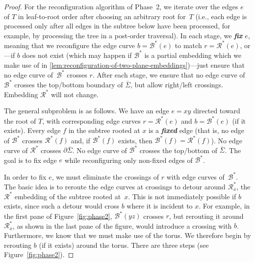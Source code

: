 \documentclass[a4paper,USenglish,cleveref,colorlinks=true,urlcolor=black,linkcolor=black,citecolor=black,thm-restate,authorcolumns]{lipics-v2021}
\theoremstyle{claimstyle}
\def\defn#1{\textit{\textbf{\boldmath #1}}}
\begin{document}
\begin{proof}
    For the reconfiguration algorithm of Phase~2,
    we iterate over the edges $e$ of $T$ in leaf-to-root order after choosing an arbitrary root for~$T$
    (i.e., each edge is processed only after all edges in the subtree below have been processed, for example, by processing the tree in a post-order traversal).
    In each stage, we \defn{fix} $e$, meaning that we reconfigure the edge curve $b = \mathcal B^* (e)$ to match $r = {\mathcal R}^*(e)$,
    or---if $b$ does not exist (which may happen if $\mathcal{B}^*$ is a partial embedding which we make use of in \cref{lem:reconfiguration-of-two-plane-embeddings})---just ensure that no edge curve of~$\mathcal B^*$ crosses $r$.
    After each stage, we ensure that no edge curve of $\mathcal B^*$ crosses the top/bottom boundary of $\bar\Sigma$, but allow right/left crossings.
    Embedding ${\mathcal R}^*$ will not change.


    The general subproblem is as follows.
    We have an edge $e = xy$ directed toward the root of $T$, with corresponding edge curves $r= \mathcal{R}^*(e)$ and $b= \mathcal{B}^*(e)$ (if it exists).
    Every edge $f$ in the subtree rooted at $x$ is a \defn{fixed} edge (that is,
    no edge of $\mathcal B^*$ crosses ${\mathcal R}^*(f)$ and, if $\mathcal B^* (f)$ exists, then
    $\mathcal B^* (f)= {\mathcal R}^*(f)$).
    No edge curve  of ${\mathcal R}^*$ crosses $\partial\bar\Sigma$.
    No edge curve of $\mathcal B^*$ crosses the top/bottom of $\bar\Sigma$.
    The goal is to fix edge $e$
    while reconfiguring only non-fixed edges of $\mathcal B^*$.

    In order to fix $e$,
    we must eliminate the crossings of $r$ with edge curves of~$\mathcal B^*$.
    The basic idea is to reroute the edge curves at crossings to detour around
    ${\mathcal R}^*_x$, the ${\mathcal R}^*$ embedding of the
    subtree rooted at~$x$.
    This is not immediately possible if $b$ exists, since such a detour would cross $b$ where it is incident to $x$.
    For example, in the first pane of Figure~\ref{fig:phase2},
    ${\mathcal B}^*(yz)$ crosses $r$, but rerouting it around
    ${\mathcal R}^*_x$, as shown in the last pane of the figure,
    would introduce a crossing with $b$.
    Furthermore, we know that we must make use of the torus.
    We therefore begin by rerouting $b$ (if it exists) around the torus.
    There are three steps (see Figure~\ref{fig:phase2}).


\end{proof}
\end{document}
